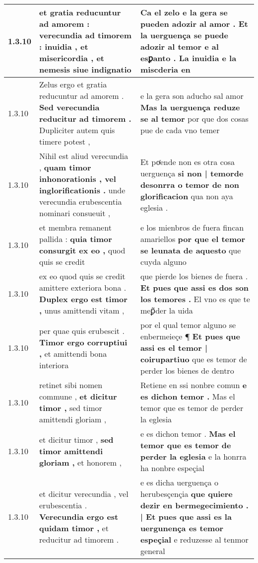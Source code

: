 \begin{tabular}{|p{1cm}|p{6.5cm}|p{6.5cm}|}
1.3.10 & et gratia reducuntur ad amorem : \textbf{ verecundia ad timorem : } inuidia , et misericordia , et nemesis siue indignatio & Ca el zelo e la gera se pueden adozir al amor . \textbf{ Et la uerguença se puede adozir al temor e al esꝑanto . } La inuidia e la miscderia en \\\hline
1.3.10 & Zelus ergo et gratia reducuntur ad amorem . \textbf{ Sed verecundia reducitur ad timorem . } Dupliciter autem quis timere potest , & e la gera son aducho sal amor \textbf{ Mas la uerguença reduze se al temor } por que dos cosas pue de cada vno temer \\\hline
1.3.10 & Nihil est aliud verecundia , \textbf{ quam timor inhonorationis , vel inglorificationis . } unde verecundia erubescentia nominari consueuit , & Et poͬende non es otra cosa uerguença \textbf{ si non | temorde desonrra o temor de non glorificacion } qua non aya eglesia . \\\hline
1.3.10 & et membra remanent pallida : \textbf{ quia timor consurgit ex eo , } quod quis se credit & e los mienbros de fuera fincan amariellos \textbf{ por que el temor se leunata de aquesto } que cuyda alguno \\\hline
1.3.10 & ex eo quod quis se credit amittere exteriora bona . \textbf{ Duplex ergo est timor , } unus amittendi vitam , & que pierde los bienes de fuera . \textbf{ Et pues que assi es dos son los temores . } El vno es que te meꝑ̃der la uida \\\hline
1.3.10 & per quae quis erubescit . \textbf{ Timor ergo corruptiui , } et amittendi bona interiora & por el qual temor alguno se enbermeieçe ¶ \textbf{ Et pues que assi es el temor | coirupartiuo } que es temor de perder los bienes de dentro \\\hline
1.3.10 & retinet sibi nomen commune , \textbf{ et dicitur timor , } sed timor amittendi gloriam , & Retiene en ssi nonbre comun \textbf{ e es dichon temor . } Mas el temor que es temor de perder la eglesia \\\hline
1.3.10 & et dicitur timor , \textbf{ sed timor amittendi gloriam , } et honorem , & e es dichon temor . \textbf{ Mas el temor que es temor de perder la eglesia } e la honrra ha nonbre espeçial \\\hline
1.3.10 & et dicitur verecundia , vel erubescentia . \textbf{ Verecundia ergo est quidam timor , } et reducitur ad timorem . & e es dicha uerguença o herubesçençia \textbf{ que quiere dezir en bermegecimiento . | Et pues que assi es la uergunença es temor espeçial } e reduzesse al tenmor general \\\hline

\end{tabular}
